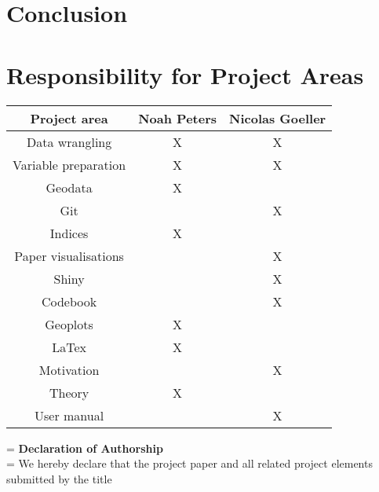 \documentclass[preprint,12pt,authoryear]{elsarticle}
\begin{document}
\section{Conclusion}

	
\newpage
 \appendix
	
\section{Responsibility for Project Areas}

\begin{tabular}{|c|c|c|}
	\hline 
	\textbf{Project area}	& \textbf{Noah Peters} 	& \textbf{Nicolas Goeller} 	\\ 
	\hline 
	Data wrangling			&  		   X			&  				X 			\\ 
	\hline 
	Variable preparation 	&  		   X			&  				X 			\\ 
	\hline 
	Geodata					&  		   X			&  				 			\\ 
	\hline 
	Git	     			 	&  		   				&  				X 			\\ 
	\hline 			
	Indices				 	&  		   X			&  				 			\\ 
	\hline 
	Paper visualisations 	&  		   				&  				X 			\\ 
	\hline 
	Shiny 				 	&  		   				&  				X 			\\ 
	\hline 
	Codebook 			 	&  		   				&  				X 			\\ 
	\hline 
	Geoplots 			 	&  		   X			&  				 			\\ 
	\hline 
	LaTex				 	&  		   X			&  				 			\\ 
	\hline 
	Motivation			 	&  		   				&  				X 			\\ 
	\hline 
	Theory				 	&  		   X			&  				 			\\ 
	\hline 
	User manual			 	&  		   				&  				X 			\\ 
	\hline 
\end{tabular}

	\newpage
	 
	
	
	\newpage
	\hangindent=\parindent
	\parindent 0pt
	\textbf{Declaration of Authorship}
	\\
	
	\hangindent=\parindent
	\parindent 0pt
	We hereby declare that the project paper and all related project elements submitted by the title 
	\\
	
\end{document}
